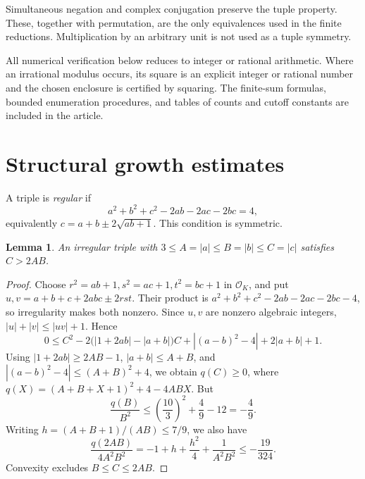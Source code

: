 \documentclass[12pt]{article}
\newtheorem{lemma}[theorem]{Lemma}
\numberwithin{equation}{section}
\begin{document}
Simultaneous negation and complex conjugation preserve the tuple
property. These, together with permutation, are the only equivalences
used in the finite reductions. Multiplication by an arbitrary unit
is not used as a tuple symmetry.

All numerical verification below reduces to integer or rational
arithmetic. Where an irrational modulus occurs, its square is an
explicit integer or rational number and the chosen enclosure is
certified by squaring. The finite-sum formulas, bounded enumeration
procedures, and tables of counts and cutoff constants are included in the article.

\section{Structural growth estimates}

A triple is \emph{regular} if
\[
 a^2+b^2+c^2-2ab-2ac-2bc=4,
\]
equivalently \(c=a+b\pm2\sqrt{ab+1}\). This condition is symmetric.

\begin{lemma}\label{lem:irregular-growth}
An irregular triple with \(3\le A=|a|\le B=|b|\le C=|c|\) satisfies
\(C>2AB\).
\end{lemma}
\begin{proof}
Choose \(r^2=ab+1,s^2=ac+1,t^2=bc+1\) in \(\mathcal O_K\), and put
\(u,v=a+b+c+2abc\pm2rst\). Their product is
\(a^2+b^2+c^2-2ab-2ac-2bc-4\), so irregularity makes both nonzero.
Since \(u,v\) are nonzero algebraic integers,
\(|u|+|v|\le|uv|+1\). Hence
\begin{equation}\label{eq:irregular-quadratic}
 0\le C^2-2\bigl(|1+2ab|-|a+b|\bigr)C
      +|(a-b)^2-4|+2|a+b|+1.
\end{equation}
Using \(|1+2ab|\ge2AB-1\), \(|a+b|\le A+B\), and
\(|(a-b)^2-4|\le(A+B)^2+4\), we obtain \(q(C)\ge0\),
where \(q(X)=(A+B+X+1)^2+4-4ABX\).
But
\[
 \frac{q(B)}{B^2}\le\left(\frac{10}{3}\right)^2+\frac49-12=-\frac49.
\]
Writing \(h=(A+B+1)/(AB)\le7/9\), we also have
\[
 \frac{q(2AB)}{4A^2B^2}
 =-1+h+\frac{h^2}{4}+\frac1{A^2B^2}\le-\frac{19}{324}.
\]
Convexity excludes \(B\le C\le2AB\).
\end{proof}
\end{document}
